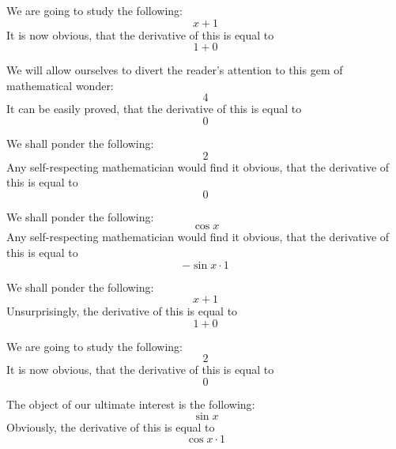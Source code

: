 \documentclass{article}
\begin{document}
We are going to study the following:
\begin{equation}
x + 1 
\end{equation}
It is now obvious, that the derivative of this is equal to
\begin{equation}
1 + 0 
\end{equation}

We will allow ourselves to divert the reader's attention to this gem of mathematical wonder:
\begin{equation}
4 
\end{equation}
It can be easily proved, that the derivative of this is equal to
\begin{equation}
0 
\end{equation}

We shall ponder the following:
\begin{equation}
2 
\end{equation}
Any self-respecting mathematician would find it obvious, that the derivative of this is equal to
\begin{equation}
0 
\end{equation}

We shall ponder the following:
\begin{equation}
\cos x 
\end{equation}
Any self-respecting mathematician would find it obvious, that the derivative of this is equal to
\begin{equation}
-\sin x \cdot 1 
\end{equation}

We shall ponder the following:
\begin{equation}
x + 1 
\end{equation}
Unsurprisingly, the derivative of this is equal to
\begin{equation}
1 + 0 
\end{equation}

We are going to study the following:
\begin{equation}
2 
\end{equation}
It is now obvious, that the derivative of this is equal to
\begin{equation}
0 
\end{equation}

The object of our ultimate interest is the following:
\begin{equation}
\sin x 
\end{equation}
Obviously, the derivative of this is equal to
\begin{equation}
\cos x \cdot 1 
\end{equation}
\end{document}
